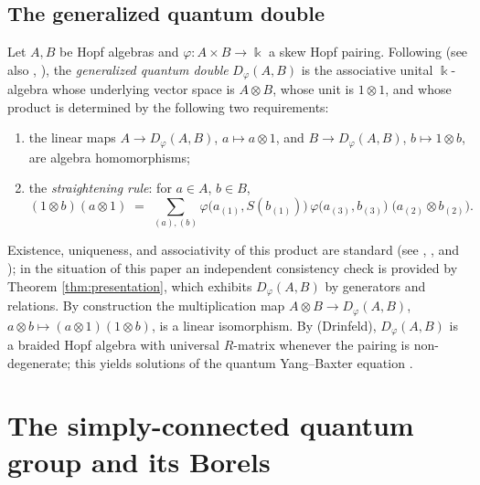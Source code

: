 \documentclass[11pt]{amsart}
\theoremstyle{definition}
\newcommand{\BK}{\Bbbk}
\begin{document}
\subsection{The generalized quantum double}\label{sec:double-construction}
Let $A,B$ be Hopf algebras and $\varphi:A\times B\to\BK$ a skew Hopf pairing.
Following \cite[\S1]{UvA} (see also \cite[\S1.4]{hal}, \cite{Maj,Kas,Dr}), the
\emph{generalized quantum double} $D_\varphi(A,B)$ is the associative unital
$\BK$-algebra whose underlying vector space is $A\otimes B$, whose unit is
$1\otimes1$, and whose product is determined by the following two requirements:
\begin{enumerate}
\item the linear maps $A\to D_\varphi(A,B)$, $a\mapsto a\otimes1$, and
$B\to D_\varphi(A,B)$, $b\mapsto1\otimes b$, are algebra homomorphisms;
\item the \emph{straightening rule}: for $a\in A$, $b\in B$,
\begin{equation}\label{eq:straightening}
(1\otimes b)(a\otimes1)\;=\;\sum_{(a),(b)}
\varphi\big(a_{(1)},S(b_{(1)})\big)\,\varphi\big(a_{(3)},b_{(3)}\big)\;
\big(a_{(2)}\otimes b_{(2)}\big).
\end{equation}
\end{enumerate}
Existence, uniqueness, and associativity of this product are standard (see
\cite[\S1, Thm.~1.7 and the discussion preceding it]{UvA}, \cite[\S1.4]{hal},
and \cite{Maj,Kas}); in the situation of this paper an independent consistency
check is provided by Theorem \ref{thm:presentation}, which exhibits
$D_\varphi(A,B)$ by generators and relations. By construction the multiplication
map $A\otimes B\to D_\varphi(A,B)$, $a\otimes b\mapsto(a\otimes1)(1\otimes b)$,
is a linear isomorphism. By \cite[Thm.~1.7]{UvA} (Drinfeld), $D_\varphi(A,B)$
is a braided Hopf algebra with universal $R$-matrix whenever the pairing is
non-degenerate; this yields solutions of the quantum Yang--Baxter equation
\cite{hal}.

\section{The simply-connected quantum group and its Borels}\label{sec:sl}
\end{document}
